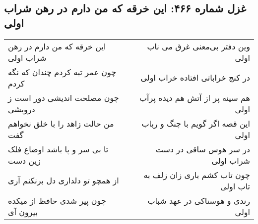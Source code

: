 \begin{center}
\section*{غزل شماره ۴۶۶: این خرقه که من دارم در رهن شراب اولی}
\label{sec:sh466}
\begin{longtable}{l p{0.5cm} r}
این خرقه که من دارم در رهن شراب اولی
&&
وین دفتر بی‌معنی غرق می ناب اولی
\\
چون عمر تبه کردم چندان که نگه کردم
&&
در کنج خراباتی افتاده خراب اولی
\\
چون مصلحت اندیشی دور است ز درویشی
&&
هم سینه پر از آتش هم دیده پرآب اولی
\\
من حالت زاهد را با خلق نخواهم گفت
&&
این قصه اگر گویم با چنگ و رباب اولی
\\
تا بی سر و پا باشد اوضاع فلک زین دست
&&
در سر هوس ساقی در دست شراب اولی
\\
از همچو تو دلداری دل برنکنم آری
&&
چون تاب کشم باری زان زلف به تاب اولی
\\
چون پیر شدی حافظ از میکده بیرون آی
&&
رندی و هوسناکی در عهد شباب اولی
\\
\end{longtable}
\end{center}
